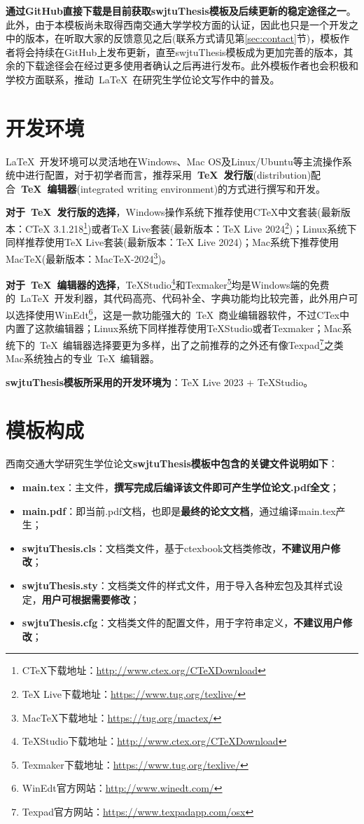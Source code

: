 \textbf{通过GitHub直接下载是目前获取swjtuThesis模板及后续更新的稳定途径之一}。此外，由于本模板尚未取得西南交通大学学校方面的认证，因此也只是一个开发之中的版本，在听取大家的反馈意见之后(联系方式请见第\ref{sec:contact}节)，模板作者将会持续在GitHub上发布更新，直至swjtuThesis模板成为更加完善的版本，其余的下载途径会在经过更多使用者确认之后再进行发布。此外模板作者也会积极和学校方面联系，推动~\LaTeX{}~在研究生学位论文写作中的普及。

\section{开发环境}

\LaTeX{}~开发环境可以灵活地在Windows、Mac OS及Linux/Ubuntu等主流操作系统中进行配置，对于初学者而言，推荐采用\textbf{~\TeX~发行版}(distribution)配合\textbf{~\TeX~编辑器}(integrated writing environment)的方式进行撰写和开发。

\textbf{对于~\TeX~发行版的选择}，Windows操作系统下推荐使用CTeX中文套装(最新版本：CTeX 3.1.218\footnote{CTeX下载地址：\url{http://www.ctex.org/CTeXDownload}})或者TeX Live套装(最新版本：TeX Live 2024\footnote{TeX Live下载地址：\url{https://www.tug.org/texlive/}})；Linux系统下同样推荐使用TeX Live套装(最新版本：TeX Live 2024)；Mac系统下推荐使用MacTeX(最新版本：MacTeX-2024\footnote{MacTeX下载地址：\url{https://tug.org/mactex/}})。

\textbf{对于~\TeX~编辑器的选择}，TeXStudio\footnote{TeXStudio下载地址：\url{http://www.ctex.org/CTeXDownload}}和Texmaker\footnote{Texmaker下载地址：\url{https://www.tug.org/texlive/}}均是Windows端的免费的~\LaTeX{}~开发利器，其代码高亮、代码补全、字典功能均比较完善，此外用户可以选择使用WinEdt\footnote{WinEdt官方网站：\url{http://www.winedt.com/}}，这是一款功能强大的~\TeX~商业编辑器软件，不过CTex中内置了这款编辑器；Linux系统下同样推荐使用TeXStudio或者Texmaker；Mac系统下的~\TeX~编辑器选择要更为多样，出了之前推荐的之外还有像Texpad\footnote{Texpad官方网站：\url{https://www.texpadapp.com/osx}}之类Mac系统独占的专业~\TeX~编辑器。

\textbf{swjtuThesis模板所采用的开发环境为}：TeX Live 2023 + TeXStudio。

\section{模板构成}

西南交通大学研究生学位论文\textbf{swjtuThesis模板中包含的关键文件说明如下}：

\begin{itemize}
	\item \textbf{main.tex}：主文件，\textbf{撰写完成后编译该文件即可产生学位论文.pdf全文}；
	\item \textbf{main.pdf}：即当前.pdf文档，也即是\textbf{最终的论文文档}，通过编译main.tex产生；
	\item \textbf{swjtuThesis.cls}：文档类文件，基于ctexbook文档类修改，\textbf{不建议用户修改}；
        \item \textbf{swjtuThesis.sty}：文档类文件的样式文件，用于导入各种宏包及其样式设定，\textbf{用户可根据需要修改}；
	\item \textbf{swjtuThesis.cfg}：文档类文件的配置文件，用于字符串定义，\textbf{不建议用户修改}；
\end{itemize}

